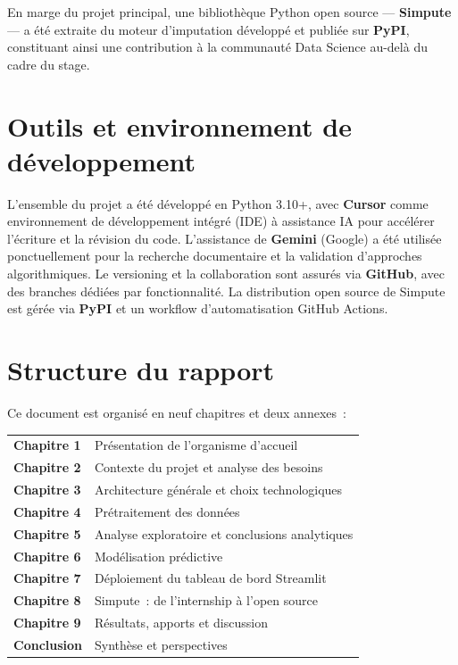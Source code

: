 \documentclass[12pt,a4paper]{report}
\begin{document}
En marge du projet principal, une bibliothèque Python open source --- \textbf{Simpute} --- a été extraite du moteur d'imputation développé et publiée sur \textbf{PyPI}, constituant ainsi une contribution à la communauté Data Science au-delà du cadre du stage.

\section*{Outils et environnement de développement}

L'ensemble du projet a été développé en Python 3.10+, avec \textbf{Cursor} comme environnement de développement intégré (IDE) à assistance IA pour accélérer l'écriture et la révision du code. L'assistance de \textbf{Gemini} (Google) a été utilisée ponctuellement pour la recherche documentaire et la validation d'approches algorithmiques. Le versioning et la collaboration sont assurés via \textbf{GitHub}, avec des branches dédiées par fonctionnalité. La distribution open source de Simpute est gérée via \textbf{PyPI} et un workflow d'automatisation GitHub Actions.

\section*{Structure du rapport}

Ce document est organisé en neuf chapitres et deux annexes~:

\medskip
\begin{tabular}{@{}ll@{}}
\textbf{Chapitre 1} & Présentation de l'organisme d'accueil \\
\textbf{Chapitre 2} & Contexte du projet et analyse des besoins \\
\textbf{Chapitre 3} & Architecture générale et choix technologiques \\
\textbf{Chapitre 4} & Prétraitement des données \\
\textbf{Chapitre 5} & Analyse exploratoire et conclusions analytiques \\
\textbf{Chapitre 6} & Modélisation prédictive \\
\textbf{Chapitre 7} & Déploiement du tableau de bord Streamlit \\
\textbf{Chapitre 8} & Simpute~: de l'internship à l'open source \\
\textbf{Chapitre 9} & Résultats, apports et discussion \\
\textbf{Conclusion} & Synthèse et perspectives \\
\end{tabular}
\end{document}
